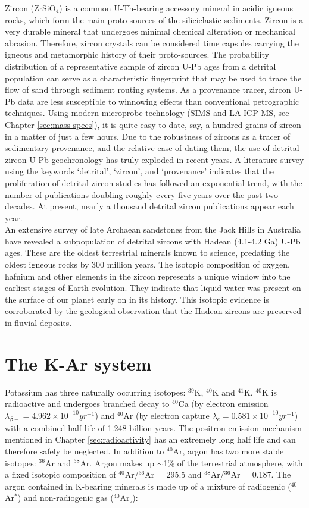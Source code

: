 \documentclass{book}
\begin{document}
Zircon (ZrSiO$_4$) is a common U-Th-bearing accessory mineral in
acidic igneous rocks, which form the main proto-sources of the
siliciclastic sediments. Zircon is a very durable mineral that
undergoes minimal chemical alteration or mechanical
abrasion. Therefore, zircon crystals can be considered time capsules
carrying the igneous and metamorphic history of their
proto-sources. The probability distribution of a representative sample
of zircon U-Pb ages from a detrital population can serve as a
characteristic fingerprint that may be used to trace the flow of sand
through sediment routing systems. As a provenance tracer, zircon U-Pb
data are less susceptible to winnowing effects than conventional
petrographic techniques. Using modern microprobe technology (SIMS and
LA-ICP-MS, see Chapter \ref{sec:mass-specs}), it is quite easy to
date, say, a hundred grains of zircon in a matter of just a few
hours. Due to the robustness of zircons as a tracer of sedimentary
provenance, and the relative ease of dating them, the use of detrital
zircon U-Pb geochronology has truly exploded in recent years. A
literature survey using the keywords `detrital', `zircon', and
`provenance' indicates that the proliferation of detrital zircon
studies has followed an exponential trend, with the number of
publications doubling roughly every five years over the past two
decades. At present, nearly a thousand detrital zircon publications
appear each year.\\

An extensive survey of late Archaean sandstones from the Jack Hills in
Australia have revealed a subpopulation of detrital zircons with
Hadean (4.1-4.2 Ga) U-Pb ages. These are the oldest terrestrial
minerals known to science, predating the oldest igneous rocks by 300
million years.  The isotopic composition of oxygen, hafnium and other
elements in the zircon represents a unique window into the earliest
stages of Earth evolution.  They indicate that liquid water was
present on the surface of our planet early on in its history. This
isotopic evidence is corroborated by the geological observation that
the Hadean zircons are preserved in fluvial deposits.

\chapter{The K-Ar system}
\label{sec:K-Ar}

Potassium has three naturally occurring isotopes: $^{39}$K, $^{40}$K
and $^{41}$K. $^{40}$K is radioactive and undergoes branched decay to
$^{40}$Ca (by electron emission $\lambda_{\beta-} = 4.962 \times
10^{-10} yr^{-1}$) and $^{40}$Ar (by electron capture $\lambda_{e} =
0.581 \times 10^{-10} yr^{-1}$) with a combined half life of 1.248
billion years. The positron emission mechanism mentioned in Chapter
\ref{sec:radioactivity} has an extremely long half life and can
therefore safely be neglected. In addition to $^{40}$Ar, argon has two
more stable isotopes: $^{36}$Ar and $^{38}$Ar. Argon makes up
$\sim$1\% of the terrestrial atmosphere, with a fixed isotopic
composition of $^{40}$Ar/$^{36}$Ar = 295.5 and $^{38}$Ar/$^{36}$Ar =
0.187. The argon contained in K-bearing minerals is made up of a
mixture of radiogenic ($^{40}$Ar$^*$) and non-radiogenic gas
($^{40}$Ar$_\circ$):
\end{document}
